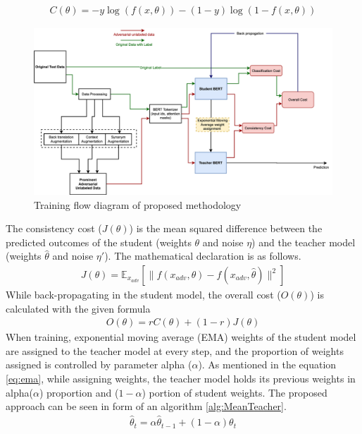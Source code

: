 \documentclass[%
	BCOR=8mm, %
	DIV=12,
	toc=bibliography, %
	toc=listof, %
	oneside, %
	egregdoesnotlikesansseriftitles, %
	]{scrbook}
\begin{document}
\begin{equation}
    \begin{aligned}
        C( \theta )=-y \log (f(x,\theta))-(1-y) \log(1-f(x,\theta))
        \label{eq:classification_cost}
    \end{aligned}
\end{equation}
 \begin{figure}[h!]
    \centering
    \includegraphics[width=1.1\textwidth]{img/Methodology.png}
    \caption[Training flow diagram of proposed approach]{Training flow diagram of proposed methodology }
    \label{diag:advMTBERT}
\end{figure}
The consistency cost ($J(\theta)$)  is the mean squared difference between the predicted outcomes of the student (weights $\theta$ and noise $\eta$) and the teacher model (weights $\hat\theta$ and noise $\eta'$).  The mathematical declaration is as follows. 
\begin{equation}
    \begin{aligned}
        J( \theta )=\mathbb{E}_{x_{adv}}[\|f(x_{adv},\theta)-f(x_{adv},\hat\theta)\|^2]
        \label{eq:ADVconsistencycost}
    \end{aligned}
\end{equation}
While back-propagating in the student model, the overall cost ($\textit{O}(\theta)$) is calculated with the given formula 
 \begin{equation}
     \begin{aligned}
         \textit{O}(\theta)= r C(\theta)+(1-r)J(\theta)
         \label{eq:overallcost}
         \end{aligned}
   \end{equation}
   When training, exponential moving average (EMA) weights of the student model are assigned to the teacher model at every step, and the proportion of weights assigned is controlled by parameter alpha ($\alpha$). As mentioned in the equation \ref{eq:ema}, while assigning weights, the teacher model holds its previous weights in alpha($\alpha$) proportion and ($1-\alpha$) portion of student weights. The proposed approach can be seen in form of an algorithm \ref{alg:MeanTeacher}.
 \begin{equation}
     \begin{aligned}
         \hat\theta_t= \alpha\hat\theta_{t-1}+(1-\alpha)\theta_t
         \label{eq:ema}
         \end{aligned}
  \end{equation}
\end{document}
